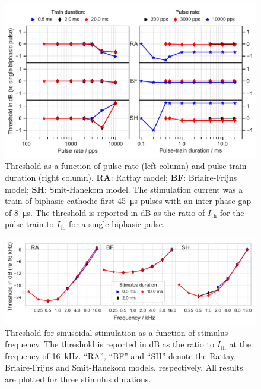 \documentclass[utf8]{frontiersSCNS} %
\newcommand{\T}[1]{\text{#1}}
\begin{document}
\begin{figure}[h!]
\begin{center}
\includegraphics[width=\linewidth]{images/thresholds_for_pulse_trains.pdf}
\end{center}
\caption{Threshold as a function of pulse rate (left column) and pulse-train duration (right column). \textbf{RA}: Rattay model; \textbf{BF}: Briaire-Frijns model; \textbf{SH}: Smit-Hanekom model. The stimulation current was a train of biphasic cathodic-first \SI{45}{\micro\second} pulses with an inter-phase gap of \SI{8}{\micro\second}. The threshold is reported in dB as the ratio of $I_{\T{th}}$ for the pulse train to $I_{\T{th}}$ for a single biphasic pulse.}
\label{fig:thresholds_for_pulse_trains}
\end{figure}

\begin{figure}[h!]
\begin{center}
  \includegraphics[width=\linewidth]{images/thresholds_for_sinus.pdf}
\end{center}
\caption{Threshold for sinusoidal stimulation as a function of stimulus frequency. The threshold is reported in dB as the ratio to $I_{\T{th}}$ at the frequency of \SI{16}{\kilo\hertz}. ``RA'', ``BF'' and ``SH'' denote the Rattay, Briaire-Frijns and Smit-Hanekom models, respectively. All results are plotted for three stimulus durations.}
\label{fig:thresholds_for_sinus}
\end{figure}
\end{document}
